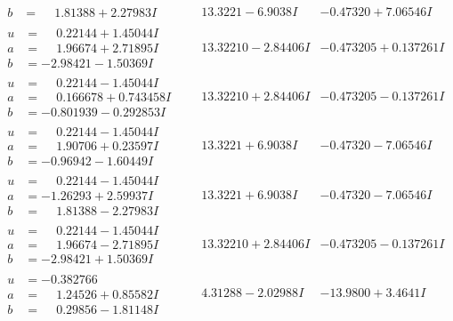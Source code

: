 \documentclass[1p]{elsarticle_modified}
\theoremstyle{definition}
\begin{document}
$$\begin{array}{c|c|c}
\begin{aligned}
b &= \phantom{-}1.81388 + 2.27983 I\end{aligned}
 & \phantom{-}13.3221 - 6.9038 I & -0.47320 + 7.06546 I \\ \hline\begin{aligned}
u &= \phantom{-}0.22144 + 1.45044 I \\
a &= \phantom{-}1.96674 + 2.71895 I \\
b &= -2.98421 - 1.50369 I\end{aligned}
 & \phantom{-}13.32210 - 2.84406 I & -0.473205 + 0.137261 I \\ \hline\begin{aligned}
u &= \phantom{-}0.22144 - 1.45044 I \\
a &= \phantom{-}0.166678 + 0.743458 I \\
b &= -0.801939 - 0.292853 I\end{aligned}
 & \phantom{-}13.32210 + 2.84406 I & -0.473205 - 0.137261 I \\ \hline\begin{aligned}
u &= \phantom{-}0.22144 - 1.45044 I \\
a &= \phantom{-}1.90706 + 0.23597 I \\
b &= -0.96942 - 1.60449 I\end{aligned}
 & \phantom{-}13.3221 + 6.9038 I & -0.47320 - 7.06546 I \\ \hline\begin{aligned}
u &= \phantom{-}0.22144 - 1.45044 I \\
a &= -1.26293 + 2.59937 I \\
b &= \phantom{-}1.81388 - 2.27983 I\end{aligned}
 & \phantom{-}13.3221 + 6.9038 I & -0.47320 - 7.06546 I \\ \hline\begin{aligned}
u &= \phantom{-}0.22144 - 1.45044 I \\
a &= \phantom{-}1.96674 - 2.71895 I \\
b &= -2.98421 + 1.50369 I\end{aligned}
 & \phantom{-}13.32210 + 2.84406 I & -0.473205 - 0.137261 I \\ \hline\begin{aligned}
u &= -0.382766\phantom{ +0.000000I} \\
a &= \phantom{-}1.24526 + 0.85582 I \\
b &= \phantom{-}0.29856 - 1.81148 I\end{aligned}
 & \phantom{-}4.31288 - 2.02988 I & -13.9800 + 3.4641 I \\ \hline\begin{aligned}

\end{aligned}
\end{array}$$
\end{document}
